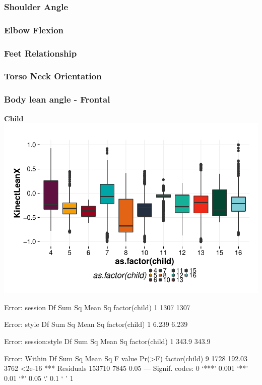 \documentclass{article}
\begin{document}
\subsubsection{Shoulder Angle}

\subsubsection{Elbow Flexion}

\subsubsection{Feet Relationship}

\subsubsection{Torso Neck Orientation}

\subsubsection{Body lean angle - Frontal}
\textbf{Child}
\includegraphics{features-plot_leanx_child_quiz}

\begin{Schunk}
\begin{Soutput}
Error: session
              Df Sum Sq Mean Sq
factor(child)  1   1307    1307

Error: style
              Df Sum Sq Mean Sq
factor(child)  1  6.239   6.239

Error: session:style
              Df Sum Sq Mean Sq
factor(child)  1  343.9   343.9

Error: Within
                  Df Sum Sq Mean Sq F value Pr(>F)    
factor(child)      9   1728  192.03    3762 <2e-16 ***
Residuals     153710   7845    0.05                   
---
Signif. codes:  0 ‘***’ 0.001 ‘**’ 0.01 ‘*’ 0.05 ‘.’ 0.1 ‘ ’ 1
\end{Soutput}
\end{Schunk}
\end{document}
